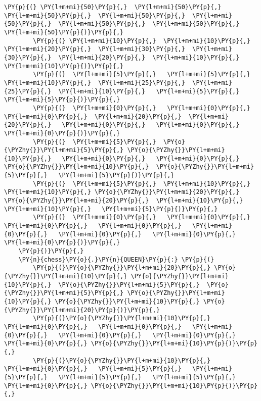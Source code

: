 \begin{tcolorbox}[fontupper=\linespread{.66}\selectfont, breakable, size=fbox, boxrule=1pt, pad at break*=1mm,colback=cellbackground, colframe=cellborder]
\begin{Verbatim}[commandchars=\\\{\}]
        \PY{p}{(} \PY{l+m+mi}{50}\PY{p}{,}  \PY{l+m+mi}{50}\PY{p}{,}  \PY{l+m+mi}{50}\PY{p}{,}  \PY{l+m+mi}{50}\PY{p}{,}  \PY{l+m+mi}{50}\PY{p}{,}  \PY{l+m+mi}{50}\PY{p}{,}  \PY{l+m+mi}{50}\PY{p}{,}  \PY{l+m+mi}{50}\PY{p}{)}\PY{p}{,}
        \PY{p}{(} \PY{l+m+mi}{10}\PY{p}{,}  \PY{l+m+mi}{10}\PY{p}{,}  \PY{l+m+mi}{20}\PY{p}{,}  \PY{l+m+mi}{30}\PY{p}{,}  \PY{l+m+mi}{30}\PY{p}{,}  \PY{l+m+mi}{20}\PY{p}{,}  \PY{l+m+mi}{10}\PY{p}{,}  \PY{l+m+mi}{10}\PY{p}{)}\PY{p}{,}
        \PY{p}{(}  \PY{l+m+mi}{5}\PY{p}{,}   \PY{l+m+mi}{5}\PY{p}{,}  \PY{l+m+mi}{10}\PY{p}{,}  \PY{l+m+mi}{25}\PY{p}{,}  \PY{l+m+mi}{25}\PY{p}{,}  \PY{l+m+mi}{10}\PY{p}{,}   \PY{l+m+mi}{5}\PY{p}{,}   \PY{l+m+mi}{5}\PY{p}{)}\PY{p}{,}
        \PY{p}{(}  \PY{l+m+mi}{0}\PY{p}{,}   \PY{l+m+mi}{0}\PY{p}{,}   \PY{l+m+mi}{0}\PY{p}{,}  \PY{l+m+mi}{20}\PY{p}{,}  \PY{l+m+mi}{20}\PY{p}{,}   \PY{l+m+mi}{0}\PY{p}{,}   \PY{l+m+mi}{0}\PY{p}{,}   \PY{l+m+mi}{0}\PY{p}{)}\PY{p}{,}
        \PY{p}{(}  \PY{l+m+mi}{5}\PY{p}{,}  \PY{o}{\PYZhy{}}\PY{l+m+mi}{5}\PY{p}{,} \PY{o}{\PYZhy{}}\PY{l+m+mi}{10}\PY{p}{,}   \PY{l+m+mi}{0}\PY{p}{,}   \PY{l+m+mi}{0}\PY{p}{,} \PY{o}{\PYZhy{}}\PY{l+m+mi}{10}\PY{p}{,}  \PY{o}{\PYZhy{}}\PY{l+m+mi}{5}\PY{p}{,}   \PY{l+m+mi}{5}\PY{p}{)}\PY{p}{,}
        \PY{p}{(}  \PY{l+m+mi}{5}\PY{p}{,}  \PY{l+m+mi}{10}\PY{p}{,}  \PY{l+m+mi}{10}\PY{p}{,} \PY{o}{\PYZhy{}}\PY{l+m+mi}{20}\PY{p}{,} \PY{o}{\PYZhy{}}\PY{l+m+mi}{20}\PY{p}{,}  \PY{l+m+mi}{10}\PY{p}{,}  \PY{l+m+mi}{10}\PY{p}{,}   \PY{l+m+mi}{5}\PY{p}{)}\PY{p}{,}
        \PY{p}{(}  \PY{l+m+mi}{0}\PY{p}{,}   \PY{l+m+mi}{0}\PY{p}{,}   \PY{l+m+mi}{0}\PY{p}{,}   \PY{l+m+mi}{0}\PY{p}{,}   \PY{l+m+mi}{0}\PY{p}{,}   \PY{l+m+mi}{0}\PY{p}{,}   \PY{l+m+mi}{0}\PY{p}{,}   \PY{l+m+mi}{0}\PY{p}{)}\PY{p}{,}
    \PY{p}{)}\PY{p}{,}
    \PY{n}{chess}\PY{o}{.}\PY{n}{QUEEN}\PY{p}{:} \PY{p}{(}
        \PY{p}{(}\PY{o}{\PYZhy{}}\PY{l+m+mi}{20}\PY{p}{,} \PY{o}{\PYZhy{}}\PY{l+m+mi}{10}\PY{p}{,} \PY{o}{\PYZhy{}}\PY{l+m+mi}{10}\PY{p}{,}  \PY{o}{\PYZhy{}}\PY{l+m+mi}{5}\PY{p}{,}  \PY{o}{\PYZhy{}}\PY{l+m+mi}{5}\PY{p}{,} \PY{o}{\PYZhy{}}\PY{l+m+mi}{10}\PY{p}{,} \PY{o}{\PYZhy{}}\PY{l+m+mi}{10}\PY{p}{,} \PY{o}{\PYZhy{}}\PY{l+m+mi}{20}\PY{p}{)}\PY{p}{,}
        \PY{p}{(}\PY{o}{\PYZhy{}}\PY{l+m+mi}{10}\PY{p}{,}   \PY{l+m+mi}{0}\PY{p}{,}   \PY{l+m+mi}{0}\PY{p}{,}   \PY{l+m+mi}{0}\PY{p}{,}   \PY{l+m+mi}{0}\PY{p}{,}   \PY{l+m+mi}{0}\PY{p}{,}   \PY{l+m+mi}{0}\PY{p}{,} \PY{o}{\PYZhy{}}\PY{l+m+mi}{10}\PY{p}{)}\PY{p}{,}
        \PY{p}{(}\PY{o}{\PYZhy{}}\PY{l+m+mi}{10}\PY{p}{,}   \PY{l+m+mi}{0}\PY{p}{,}   \PY{l+m+mi}{5}\PY{p}{,}   \PY{l+m+mi}{5}\PY{p}{,}   \PY{l+m+mi}{5}\PY{p}{,}   \PY{l+m+mi}{5}\PY{p}{,}   \PY{l+m+mi}{0}\PY{p}{,} \PY{o}{\PYZhy{}}\PY{l+m+mi}{10}\PY{p}{)}\PY{p}{,}

\end{Verbatim}
\end{tcolorbox}
